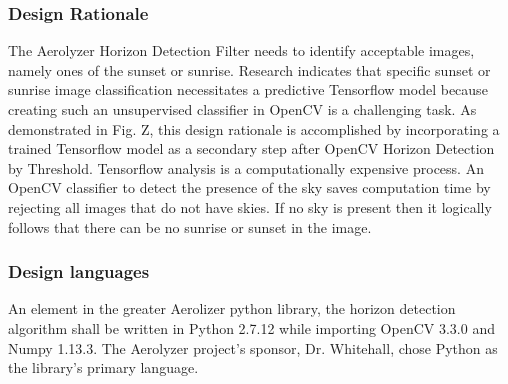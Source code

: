 \documentclass[onecolumn, draftclsnofoot,10pt, compsoc]{IEEEtran}
\begin{document}
\begin{singlespace}
      \subsubsection{Design Rationale}
      	The Aerolyzer Horizon Detection Filter needs to identify acceptable images, namely ones of the sunset or sunrise.
		Research indicates that specific sunset or sunrise image classification  necessitates a predictive Tensorflow model because creating such an unsupervised classifier in OpenCV is a challenging task.
		As demonstrated in Fig.
		Z, this design rationale is accomplished by incorporating a trained Tensorflow model as a secondary step after OpenCV Horizon Detection by Threshold.
		Tensorflow analysis is a computationally expensive process.
		An OpenCV classifier to detect the presence of the sky saves computation time by rejecting all images that do not have skies.
		If no sky is present then it logically follows that there can be no sunrise or sunset in the image.

      \subsubsection{Design languages}
      	An element in the greater Aerolizer python library, the horizon detection algorithm shall be written in Python 2.7.12 while importing OpenCV 3.3.0 and Numpy 1.13.3.
		The Aerolyzer project’s sponsor, Dr.
		Whitehall, chose Python as the library’s primary language.
		

\end{singlespace}
\end{document}
